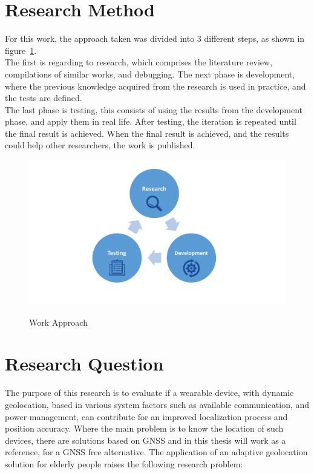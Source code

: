 \section{Research Method}
\label{sec:research_method}

For this work, the approach taken was divided into 3 different steps, as shown in figure~\ref{fig:WorkApp}.\\
The first is regarding to research, which comprises the literature review, compilations of similar works, and debugging. The next phase is development, where the previous knowledge acquired from the research is used in practice, and the tests are defined.\\
The last phase is testing, this consists of using the results from the development phase, and apply them in real life. After testing, the iteration is repeated until the final result is achieved. When the final result is achieved, and the results could help other researchers, the work is published.


\begin{figure}[htbp]
  \centering
    {\includegraphics[height=2.5in,width=1\linewidth]{Chapters/Figures/r&d.png}}%
  \caption{Work Approach}
  \label{fig:WorkApp}
\end{figure}


\newpage
\section{Research Question} %
\label{sec:research_question}

The purpose of this research is to evaluate if a wearable device, with dynamic geolocation,  based in various system factors such as available communication, and power management, can contribute for an improved localization process and position accuracy. Where the main problem is to know the location of such devices, there are solutions based on GNSS and in this thesis will work as a reference, for a GNSS free alternative. The application of an adaptive geolocation solution for elderly people raises the following research problem:

